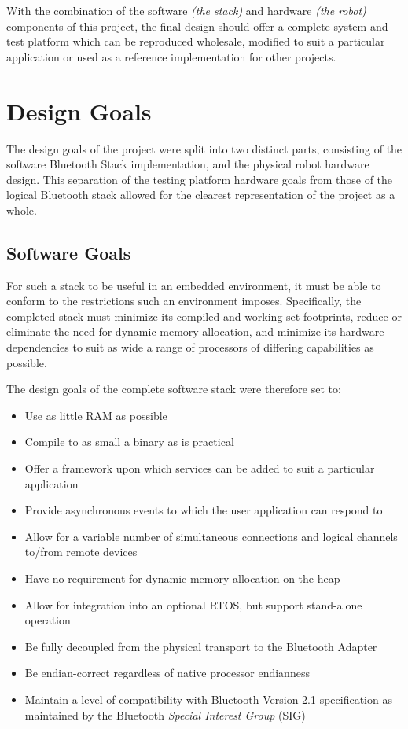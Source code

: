 
With the combination of the software \emph{(the stack)} and hardware \emph{(the robot)} components of this project, the final design should offer a complete system and test platform which can be reproduced wholesale, modified to suit a particular application or used as a reference implementation for other projects.

\section{Design Goals}

The design goals of the project were split into two distinct parts, consisting of the software Bluetooth Stack implementation, and the physical robot hardware design. This separation of the testing platform hardware goals from those of the logical Bluetooth stack allowed for the clearest representation of the project as a whole.

\subsection{Software Goals}

For such a stack to be useful in an embedded environment, it must be able to conform to the restrictions such an environment imposes. Specifically, the completed stack must minimize its compiled and working set footprints, reduce or eliminate the need for dynamic memory allocation, and minimize its hardware dependencies to suit as wide a range of processors of differing capabilities as possible.

The design goals of the complete software stack were therefore set to:

\begin{itemize}
	\item Use as little RAM as possible
	\item Compile to as small a binary as is practical
	\item Offer a framework upon which services can be added to suit a particular application
	\item Provide asynchronous events to which the user application can respond to
	\item Allow for a variable number of simultaneous connections and logical channels to/from remote devices
	\item Have no requirement for dynamic memory allocation on the heap
	\item Allow for integration into an optional RTOS, but support stand-alone operation
	\item Be fully decoupled from the physical transport to the Bluetooth Adapter
	\item Be endian-correct regardless of native processor endianness
	\item Maintain a level of compatibility with Bluetooth Version 2.1 specification as maintained by the Bluetooth \textit{Special Interest Group} (SIG)
\end{itemize}

